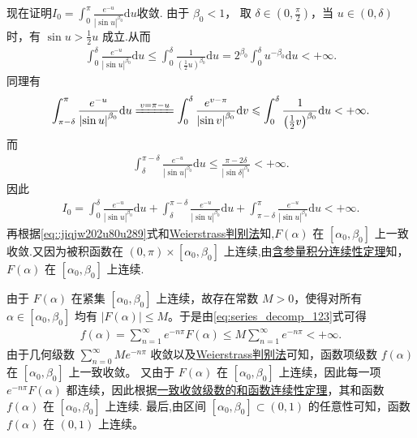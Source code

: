 \documentclass[../../main.tex]{subfiles}%
\begin{document}
\begin{solution}
\begin{enumerate}[(1)]
现在证明\(I_0 = \int_{0}^{\pi} \frac{e^{-u}}{|\sin u|^{\beta_0}} \mathrm{d}u\)收敛.
由于 \(\beta_0 < 1\)，
取 \(\delta \in (0, \frac{\pi}{2})\)，当 \(u \in (0, \delta)\) 时，有 \(\sin u > \frac{1}{2} u\) 成立.从而
\begin{align*}
\int_{0}^{\delta} \frac{e^{-u}}{|\sin u|^{\beta_0}} \mathrm{d}u 
\leqslant \int_{0}^{\delta} \frac{1}{(\frac{1}{2} u)^{\beta_0}} \mathrm{d}u = 2^{\beta_0} \int_{0}^{\delta} u^{-\beta_0} \mathrm{d}u < +\infty.
\end{align*}
同理有
\begin{align*}
\int_{\pi -\delta}^{\pi}{\frac{e^{-u}}{\left| \sin u \right|^{\beta _0}}\mathrm{d}u}\xlongequal{v=\pi -u}\int_0^{\delta}{\frac{e^{v-\pi}}{\left| \sin v \right|^{\beta _0}}\mathrm{d}v}\leqslant \int_0^{\delta}{\frac{1}{\left( \frac{1}{2}v \right) ^{\beta _0}}\mathrm{d}u}<+\infty .
\end{align*}
而
\begin{align*}
\int_{\delta}^{\pi -\delta}{\frac{e^{-u}}{\left| \sin u \right|^{\beta _0}}\mathrm{d}u}\leqslant \frac{\pi -2\delta}{\left| \sin \delta \right|^{\beta _0}}<+\infty .
\end{align*}
因此
\begin{align*}
I_0=\int_0^{\delta}{\frac{e^{-u}}{\left| \sin u \right|^{\beta _0}}\mathrm{d}u}+\int_{\delta}^{\pi -\delta}{\frac{e^{-u}}{\left| \sin u \right|^{\beta _0}}\mathrm{d}u}+\int_{\pi -\delta}^{\pi}{\frac{e^{-u}}{\left| \sin u \right|^{\beta _0}}\mathrm{d}u}<+\infty .
\end{align*}
再根据\eqref{eq::jiqjw202u80u289}式和\hyperref[theorem:含参量反常积分一致收敛判别法]{Weierstrass判别法}知,\(F(\alpha)\) 在 \([\alpha_0, \beta_0]\) 上一致收敛.又因为被积函数在 \((0, \pi) \times [\alpha_0, \beta_0]\) 上连续,由\hyperref[theorem:含参量反常积分的连续性]{含参量积分连续性定理}知，\(F(\alpha)\) 在 \([\alpha_0, \beta_0]\) 上连续.

由于 \(F(\alpha)\) 在紧集 \([\alpha_0, \beta_0]\) 上连续，故存在常数 \(M > 0\)，使得对所有 \(\alpha \in [\alpha_0, \beta_0]\) 均有 \(|F(\alpha)| \leqslant M\)。于是由\eqref{eq:series_decomp_123}式可得
\begin{align*}
f\left( \alpha \right) =\sum_{n=1}^{\infty}{e^{-n\pi}F\left( \alpha \right)}\leqslant M\sum_{n=1}^{\infty}{e^{-n\pi}}<+\infty .
\end{align*}
由于几何级数 \(\sum_{n=0}^{\infty} M e^{-n\pi}\) 收敛以及\hyperref[theorem:含参量反常积分一致收敛判别法]{Weierstrass判别法}可知，函数项级数 \(f(\alpha)\) 在 \([\alpha_0, \beta_0]\) 上一致收敛。
又由于 \(F(\alpha)\) 在 \([\alpha_0, \beta_0]\) 上连续，因此每一项 \(e^{-n\pi} F(\alpha)\) 都连续，因此根据\hyperref[theorem:函数项级数连续性定理]{一致收敛级数的和函数连续性定理}，其和函数 \(f(\alpha)\) 在 \([\alpha_0, \beta_0]\) 上连续.
最后,由区间 \([\alpha_0, \beta_0] \subset (0,1)\) 的任意性可知，函数 \(f(\alpha)\) 在 \((0,1)\) 上连续。


\end{enumerate}
\end{solution}
\end{document}
